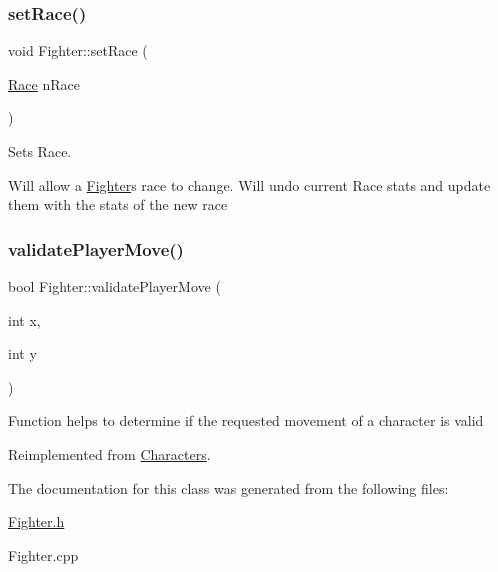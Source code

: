 \subsubsection{\texorpdfstring{set\+Race()}{setRace()}}
{\footnotesize\ttfamily void Fighter\+::set\+Race (\begin{DoxyParamCaption}\item[{\hyperlink{_entity_8h_aa2df4028f474807638d438104900b003}{Race}}]{n\+Race }\end{DoxyParamCaption})}



Sets Race. 

Will allow a \hyperlink{class_fighter}{Fighter}\textquotesingle{}s race to change. Will undo current Race stats and update them with the stats of the new race \hypertarget{class_fighter_ab2a750803d7df7f1d66e9b40074f7a41}{}\label{class_fighter_ab2a750803d7df7f1d66e9b40074f7a41} 
\subsubsection{\texorpdfstring{validate\+Player\+Move()}{validatePlayerMove()}}
{\footnotesize\ttfamily bool Fighter\+::validate\+Player\+Move (\begin{DoxyParamCaption}\item[{int}]{x,  }\item[{int}]{y }\end{DoxyParamCaption})\hspace{0.3cm}{\ttfamily [virtual]}}

Function helps to determine if the requested movement of a character is valid 

Reimplemented from \hyperlink{class_characters_a42bbd977aed8772f446510e7fcfd577f}{Characters}.



The documentation for this class was generated from the following files\+:\begin{DoxyCompactItemize}
\item 
\hyperlink{_fighter_8h}{Fighter.\+h}\item 
Fighter.\+cpp\end{DoxyCompactItemize}
